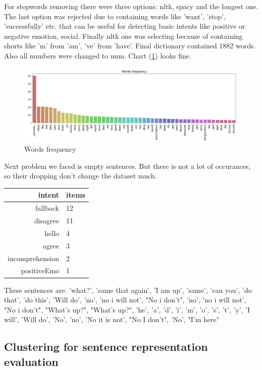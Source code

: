 \documentclass[11pt]{article}
\begin{document}
For stopwords removing there were three options: nltk, spacy and the longest one. The last option was rejected due to containing words like 'want', 'stop', 'successfully' etc. that can be useful for detecting basic intents like positive or negative emotion, social. Finally nltk one was selecting because of containing shorts like 'm' from 'am', 've' from 'have'. Final dictionary contained 1882 words. Also all numbers were changed to num. Chart (\ref{words_freq}) looks fine.

 \begin{figure}[h]
 	\centering
 	\includegraphics[scale=0.4]{report2.png}
	\caption{Words frequency}
 \label{words_freq}
 \end{figure}
\FloatBarrier

Next problem we faced is empty sentences. But there is not a lot of occurances, so their dropping don't change the dataset much.

\begin{tabular}{ |r|l| }
\hline
intent & items \\ \hline
fallback          & 12 \\ \hline
disagree          & 11 \\ \hline
hello             &  4 \\ \hline
agree             &  3 \\ \hline
incomprehension   &  2 \\ \hline
positiveEmo       &  1 \\ \hline
\end{tabular}

These sentences are: 'what?', 'same that again', 'I am up', 'same', 'can you',
       'do that', 'do this', 'Will do', 'no', 'no i will not',
       "No i don't", 'no', 'no i will not', "No i don't", "What's up?",
       "What's up?", 'he', 'a', 'd', 'i', 'm', 'o', 's', 't', 'y',
       'I will', 'Will do', 'No', 'no', 'No it is not', "No I don't",
       'No', "I'm here"


\subsection{Clustering for sentence representation evaluation}
\label{subsec:clustering2}
\end{document}

